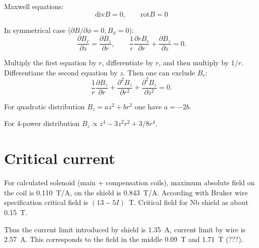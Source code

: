 \documentclass[a4paper]{article}
\begin{document}
Maxwell equations:
$$
\mbox{div} B = 0,\qquad
\mbox{rot} B = 0
$$

In symmetrical case ($\partial B/\partial\phi = 0, B_\phi=0$):
$$
\frac{\partial B_r}{\partial z} = \frac{\partial B_z}{\partial r}, \qquad
\frac{1}{r} \frac{\partial r B_r}{\partial r} + \frac{\partial B_z}{\partial z}=0.
$$

Multiply the first equation by $r$, differentiate by $r$, and then multiply by $1/r$.
Differentiane the second equation by $z$. Then one can exclude $B_r$:
$$
\frac{1}{r} \frac{\partial B_z}{\partial r}
 + \frac{\partial^2 B_z}{\partial r^2}
 + \frac{\partial^2 B_z}{\partial z^2}=0.
$$

For quadratic distribution $B_z = az^2 + br^2$ one have $a=-2b$.

For 4-power distribution $B_z \propto z^4 - 3 z^2 r^2 + 3/8 r^4$.

\section*{Critical current}

For calculated solenoid (main + compensation coils), maximum absolute
field on the coil is 0.110~T/A, on the shield is 0.843~T/A.
According with Bruker wire specification critical field is $(13-5I)$~T.
Critical field for Nb shield as about 0.15~T.

Thus the current limit introduced by shield is 1.35~A,
current limit by wire is 2.57~A. This corresponds to the
field in the middle 0.09~T and 1.71~T (???).
\end{document}
